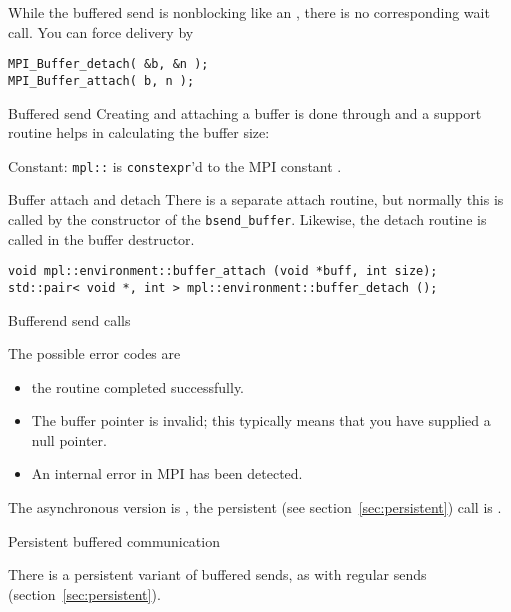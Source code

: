 While the buffered send is nonblocking like an ,
there is no corresponding wait call.
You can force delivery by
\begin{lstlisting}
MPI_Buffer_detach( &b, &n );
MPI_Buffer_attach( b, n );
\end{lstlisting}

\begin{mplnote}{Buffered send}
  Creating and attaching a buffer is done through 
  and a support routine  helps in calculating
  the buffer size:

  Constant: \lstinline+mpl::+ is \lstinline{constexpr}'d
  to the MPI constant .
\end{mplnote}

\begin{mplnote}{Buffer attach and detach}
  There is a separate attach routine, but normally this is called
  by the constructor of the \lstinline+bsend_buffer+.
  Likewise, the detach routine is called in the buffer destructor.
\begin{lstlisting}
void mpl::environment::buffer_attach (void *buff, int size);
std::pair< void *, int > mpl::environment::buffer_detach ();
\end{lstlisting}
\end{mplnote}

 {Bufferend send calls}

The possible error codes are
\begin{itemize}
\item {} the routine completed successfully.
\item {} The buffer pointer is invalid;
  this typically means that you have supplied a null pointer.
\item {} An internal error in MPI has been detected.
\end{itemize}

The asynchronous version is , the persistent
(see section~\ref{sec:persistent}) call is .

 {Persistent buffered communication}

There is a persistent variant 
of buffered sends, as with regular
sends (section~\ref{sec:persistent}).

